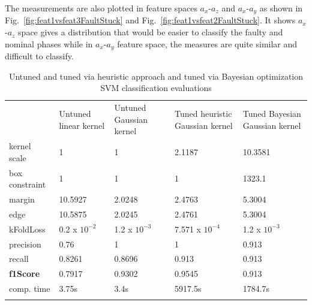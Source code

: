 
The measurements are also plotted in feature spaces $a_x$-$a_z$ and $a_x$-$a_y$ as shown in Fig.~\ref{fig:feat1vsfeat3FaultStuck} and Fig.~\ref{fig:feat1vsfeat2FaultStuck}. 
It shows $a_x$-$a_z$ space gives a distribution that would be easier to classify the faulty and nominal phases while in $a_x$-$a_y$ feature space, the measures are quite similar and difficult to classify.

\begin{table}[!ht]
	\centering
\caption{Untuned and tuned via heuristic approach and tuned via Bayesian optimization SVM classification evaluations}
\label{tab:stuck}       %
\begin{tabular}{p{2.7cm}p{2.0cm}p{2.3cm}p{3cm}p{3cm}}
\hline\noalign{\smallskip}
 & Untuned linear kernel & Untuned Gaussian kernel & Tuned heuristic Gaussian kernel & Tuned Bayesian Gaussian kernel\\
\noalign{\smallskip}\hline\noalign{\smallskip}
kernel scale & 1 & 1 & 2.1187 & 10.3581 \\
box constraint & 1 & 1 & 1 & 1323.1 \\
margin & 10.5927 & 2.0248 & 2.4763 & 5.3004 \\
edge & 10.5875 & 2.0245 & 2.4761 & 5.3004 \\
kFoldLoss & 0.2 x $10^{-2}$ & 1.2 x $10^{-3}$& 7.571 x $10^{-4}$ & 1.2 x $10^{-3}$ \\
precision & 0.76 & 1 & 1 & 0.913 \\
recall & 0.8261 & 0.8696 & 0.913 & 0.913\\
\textbf{f1Score} & 0.7917 & 0.9302 &0.9545 & 0.913 \\
comp. time & 3.75s & 3.4s & 5917.5s & 1784.7s \\
\noalign{\smallskip}\hline
\end{tabular}
\end{table}


